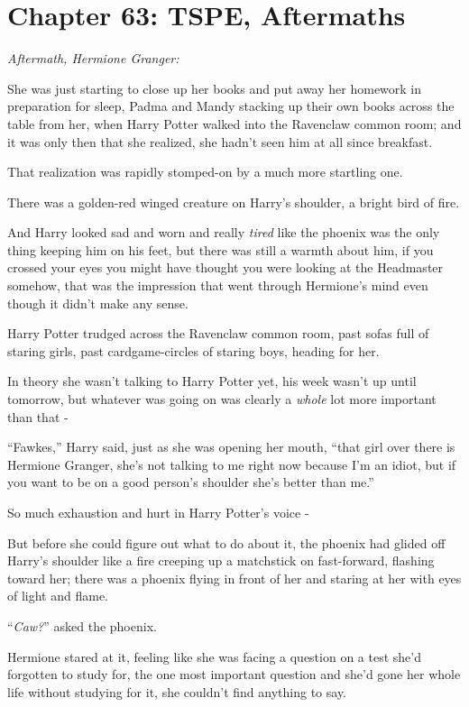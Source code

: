 \chapter{Chapter 63: TSPE, Aftermaths}
\emph{Aftermath, Hermione Granger:}

She was just starting to close up her books and put away her homework in preparation for sleep, Padma and Mandy stacking up their own books across the table from her, when Harry Potter walked into the Ravenclaw common room; and it was only then that she realized, she hadn't seen him at all since breakfast.

That realization was rapidly stomped-on by a much more startling one.

There was a golden-red winged creature on Harry's shoulder, a bright bird of fire.

And Harry looked sad and worn and really \emph{tired} like the phoenix was the only thing keeping him on his feet, but there was still a warmth about him, if you crossed your eyes you might have thought you were looking at the Headmaster somehow, that was the impression that went through Hermione's mind even though it didn't make any sense.

Harry Potter trudged across the Ravenclaw common room, past sofas full of staring girls, past cardgame-circles of staring boys, heading for her.

In theory she wasn't talking to Harry Potter yet, his week wasn't up until tomorrow, but whatever was going on was clearly a \emph{whole} lot more important than that -

``Fawkes,'' Harry said, just as she was opening her mouth, ``that girl over there is Hermione Granger, she's not talking to me right now because I'm an idiot, but if you want to be on a good person's shoulder she's better than me.''

So much exhaustion and hurt in Harry Potter's voice -

But before she could figure out what to do about it, the phoenix had glided off Harry's shoulder like a fire creeping up a matchstick on fast-forward, flashing toward her; there was a phoenix flying in front of her and staring at her with eyes of light and flame.

``\emph{Caw?}'' asked the phoenix.

Hermione stared at it, feeling like she was facing a question on a test she'd forgotten to study for, the one most important question and she'd gone her whole life without studying for it, she couldn't find anything to say.

